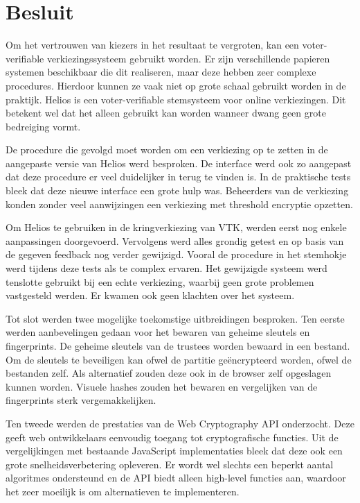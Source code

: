 % 
%

\chapter{Besluit}
\label{chap:besluit}

Om het vertrouwen van kiezers in het resultaat te vergroten, kan een voter-verifiable verkiezingssysteem gebruikt worden. Er zijn verschillende papieren systemen beschikbaar die dit realiseren, maar deze hebben zeer complexe procedures. Hierdoor kunnen ze vaak niet op grote schaal gebruikt worden in de praktijk. Helios is een voter-verifiable stemsysteem voor online verkiezingen. Dit betekent wel dat het alleen gebruikt kan worden wanneer dwang geen grote bedreiging vormt.

\npar De procedure die gevolgd moet worden om een verkiezing op te zetten in de aangepaste versie van Helios werd besproken. De interface werd ook zo aangepast dat deze procedure er veel duidelijker in terug te vinden is. In de praktische tests bleek dat deze nieuwe interface een grote hulp was. Beheerders van de verkiezing konden zonder veel aanwijzingen een verkiezing met threshold encryptie opzetten.

\npar Om Helios te gebruiken in de kringverkiezing van VTK, werden eerst nog enkele aanpassingen doorgevoerd. Vervolgens werd alles grondig getest en op basis van de gegeven feedback nog verder gewijzigd. Vooral de procedure in het stemhokje werd tijdens deze tests als te complex ervaren. Het gewijzigde systeem werd tenslotte gebruikt bij een echte verkiezing, waarbij geen grote problemen vastgesteld werden. Er kwamen ook geen klachten over het systeem.

\npar Tot slot werden twee mogelijke toekomstige uitbreidingen besproken. Ten eerste werden aanbevelingen gedaan voor het bewaren van geheime sleutels en fingerprints. De geheime sleutels van de trustees worden bewaard in een bestand. Om de sleutels te beveiligen kan ofwel de partitie ge\"encrypteerd worden, ofwel de bestanden zelf. Als alternatief zouden deze ook in de browser zelf opgeslagen kunnen worden. Visuele hashes zouden het bewaren en vergelijken van de fingerprints sterk vergemakkelijken.

\npar Ten tweede werden de prestaties van de Web Cryptography API onderzocht. Deze geeft web ontwikkelaars eenvoudig toegang tot cryptografische functies. Uit de vergelijkingen met bestaande JavaScript implementaties bleek dat deze ook een grote snelheidsverbetering opleveren. Er wordt wel slechts een beperkt aantal algoritmes ondersteund en de API biedt alleen high-level functies aan, waardoor het zeer moeilijk is om alternatieven te implementeren.
